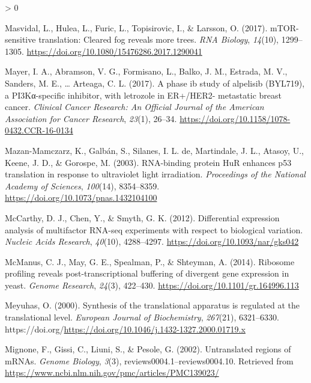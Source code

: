 \documentclass[
  12pt,
  openany]{book}
\newlength{\cslhangindent}
\newenvironment{CSLReferences}[2] %
 {%
  \setlength{\parindent}{0pt}
  \ifodd #1 \everypar{\setlength{\hangindent}{\cslhangindent}}\ignorespaces\fi
  \ifnum #2 > 0
  \setlength{\parskip}{#2\baselineskip}
  \fi
 }%
 {}
\begin{document}
\begin{CSLReferences}{1}{0}
\leavevmode\hypertarget{ref-Masvidal2017}{}%
Masvidal, L., Hulea, L., Furic, L., Topisirovic, I., \& Larsson, O. (2017). {mTOR}-sensitive translation: Cleared fog reveals more trees. \emph{{RNA} Biology}, \emph{14}(10), 1299--1305. \url{https://doi.org/10.1080/15476286.2017.1290041}

\leavevmode\hypertarget{ref-Mayer2017}{}%
Mayer, I. A., Abramson, V. G., Formisano, L., Balko, J. M., Estrada, M. V., Sanders, M. E., \ldots{} Arteaga, C. L. (2017). A phase ib study of alpelisib ({BYL}719), a {PI}3Kα-specific inhibitor, with letrozole in {ER}+/{HER}2- metastatic breast cancer. \emph{Clinical Cancer Research: An Official Journal of the American Association for Cancer Research}, \emph{23}(1), 26--34. \url{https://doi.org/10.1158/1078-0432.CCR-16-0134}

\leavevmode\hypertarget{ref-Mazan-Mamczarz2003}{}%
Mazan-Mamczarz, K., Galbán, S., Silanes, I. L. de, Martindale, J. L., Atasoy, U., Keene, J. D., \& Gorospe, M. (2003). {RNA}-binding protein {HuR} enhances p53 translation in response to ultraviolet light irradiation. \emph{Proceedings of the National Academy of Sciences}, \emph{100}(14), 8354--8359. \url{https://doi.org/10.1073/pnas.1432104100}

\leavevmode\hypertarget{ref-McCarthy2012}{}%
McCarthy, D. J., Chen, Y., \& Smyth, G. K. (2012). Differential expression analysis of multifactor {RNA}-seq experiments with respect to biological variation. \emph{Nucleic Acids Research}, \emph{40}(10), 4288--4297. \url{https://doi.org/10.1093/nar/gks042}

\leavevmode\hypertarget{ref-McManus2014}{}%
McManus, C. J., May, G. E., Spealman, P., \& Shteyman, A. (2014). Ribosome profiling reveals post-transcriptional buffering of divergent gene expression in yeast. \emph{Genome Research}, \emph{24}(3), 422--430. \url{https://doi.org/10.1101/gr.164996.113}

\leavevmode\hypertarget{ref-Meyuhas2000}{}%
Meyuhas, O. (2000). Synthesis of the translational apparatus is regulated at the translational level. \emph{European Journal of Biochemistry}, \emph{267}(21), 6321--6330. https://doi.org/\url{https://doi.org/10.1046/j.1432-1327.2000.01719.x}

\leavevmode\hypertarget{ref-Mignone2002}{}%
Mignone, F., Gissi, C., Liuni, S., \& Pesole, G. (2002). Untranslated regions of {mRNAs}. \emph{Genome Biology}, \emph{3}(3), reviews0004.1--reviews0004.10. Retrieved from \url{https://www.ncbi.nlm.nih.gov/pmc/articles/PMC139023/}


\end{CSLReferences}
\end{document}
